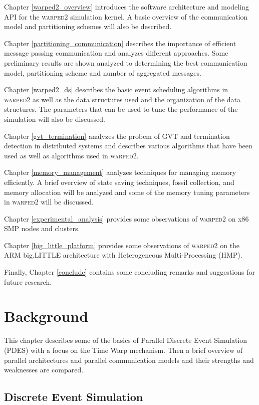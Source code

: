 \documentclass[11pt]{book}
\begin{document}
Chapter \ref{warped2_overview} introduces the software architecture and modeling API for
the \textsc{warped2} simulation kernel. A basic overview of the communication model and
partitioning schemes will also be described.

Chapter \ref{partitioning_communication} describes the importance of efficient message passing
communication and analyzes different approaches. Some preliminary results are shown analyzed
to determining the best communication model, partitioning scheme and number of aggregated
messages.

Chapter \ref{warped2_ds} describes the basic event scheduling algorithms in \textsc{warped2}
as well as the data structures used and the organization of the data structures. The parameters
that can be used to tune the performance of the simulation will also be discussed.

Chapter \ref{gvt_termination} analyzes the probem of GVT and termination detection in distributed
systems and describes various algorithms that have been used as well as algorithms used in
\textsc{warped2}.

Chapter \ref{memory_management} analyzes techniques for managing memory efficiently. A brief
overview of state saving techniques, fossil collection, and memory allocation will be analyzed
and some of the memory tuning parameters in \textsc{warped2} will be discussed.

Chapter \ref{experimental_analysis} provides some observations of \textsc{warped2} on x86 SMP
nodes and clusters.

Chapter \ref{big_little_platform} provides some observations of \textsc{warped2} on the
ARM big.LITTLE architecture with Heterogeneous Multi-Processing (HMP).

Finally, Chapter \ref{conclude} contains some concluding remarks and suggestions for future
research.



\chapter{Background}\label{background}

This chapter describes some of the basics of Parallel Discrete Event Simulation (PDES) with
a focus on the Time Warp mechanism. Then a brief overview of parallel architectures and
parallel communication models and their strengths and weaknesses are compared.

\section{Discrete Event Simulation}
\end{document}
